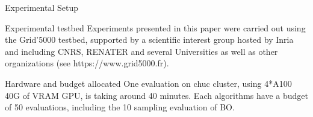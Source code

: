 \begin{frame}{Experimental Setup}

    \begin{block}{Experimental testbed}
        Experiments presented in this paper were carried out using the Grid'5000 testbed, supported by a scientific interest group hosted by Inria and including CNRS, RENATER and several Universities as well as other organizations (see https://www.grid5000.fr).
    \end{block}
    
    \begin{block}{Hardware and budget allocated}
        One evaluation on chuc cluster, using 4*A100 40G of VRAM GPU, is taking around 40 minutes. Each algorithms have a budget of 50 evaluations, including the 10 sampling evaluation of BO. 
    \end{block}


    
    
\end{frame}
